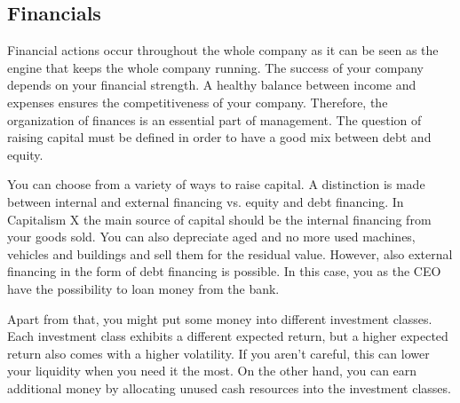 \subsection{Financials} \label{finance_manual}

Financial actions occur throughout the whole company as it can be seen as the engine that keeps the whole company running. The success of your company depends on your financial strength. A healthy balance between income and expenses ensures the competitiveness of your company. Therefore, the organization of finances is an essential part of management. The question of raising capital must be defined in order to have a good mix between debt and equity.

You can choose from a variety of ways to raise capital. A distinction is made between internal and external financing vs. equity and debt financing.
In Capitalism X the main source of capital should be the internal financing from your goods sold. You can also depreciate aged and no more used machines, vehicles and buildings and sell them for the residual value. However, also external financing in the form of debt financing is possible. In this case, you as the CEO have the possibility to loan money from the bank.

Apart from that, you might put some money into different investment classes. Each investment class exhibits a different expected return, but a higher expected return also comes with a higher volatility. If you aren't careful, this can lower your liquidity when you need it the most. On the other hand, you can earn additional money by allocating unused cash resources into the investment classes.

